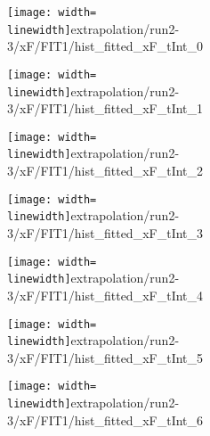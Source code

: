 \begin{figure}
\begin{subfigure}{0.45\linewidth}
\texttt{[image: width=\\linewidth]}{extrapolation/run2-3/xF/FIT1/hist_fitted_xF_tInt_0}
\end{subfigure}
\begin{subfigure}{0.45\linewidth}
\texttt{[image: width=\\linewidth]}{extrapolation/run2-3/xF/FIT1/hist_fitted_xF_tInt_1}
\end{subfigure}
\begin{subfigure}{0.45\linewidth}
\texttt{[image: width=\\linewidth]}{extrapolation/run2-3/xF/FIT1/hist_fitted_xF_tInt_2}
\end{subfigure}
\begin{subfigure}{0.45\linewidth}
\texttt{[image: width=\\linewidth]}{extrapolation/run2-3/xF/FIT1/hist_fitted_xF_tInt_3}
\end{subfigure}
\begin{subfigure}{0.45\linewidth}
\texttt{[image: width=\\linewidth]}{extrapolation/run2-3/xF/FIT1/hist_fitted_xF_tInt_4}
\end{subfigure}
\begin{subfigure}{0.45\linewidth}
\texttt{[image: width=\\linewidth]}{extrapolation/run2-3/xF/FIT1/hist_fitted_xF_tInt_5}
\end{subfigure}
\begin{subfigure}{0.45\linewidth}
\texttt{[image: width=\\linewidth]}{extrapolation/run2-3/xF/FIT1/hist_fitted_xF_tInt_6}
\end{subfigure}
\end{figure}

